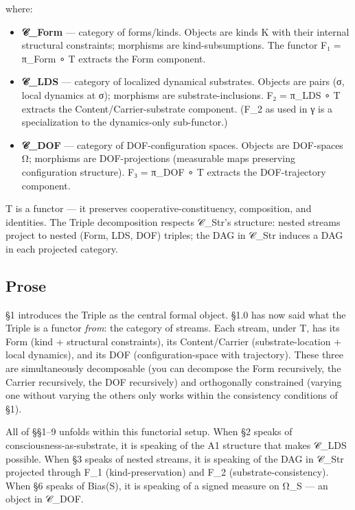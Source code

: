 \documentclass[11pt, openany]{book}
\begin{document}
where:

\begin{itemize}
\item \textbf{𝒞\_\allowbreak{}Form} --- category of forms/kinds. Objects are kinds K with their internal structural constraints; morphisms are kind-subsumptions. The functor F₁ = π\_\allowbreak{}Form ∘ T extracts the Form component.
\item \textbf{𝒞\_\allowbreak{}LDS} --- category of localized dynamical substrates. Objects are pairs (σ, local dynamics at σ); morphisms are substrate-inclusions. F₂ = π\_\allowbreak{}LDS ∘ T extracts the Content/Carrier-substrate component. (F\_\allowbreak{}2 as used in γ is a specialization to the dynamics-only sub-functor.)
\item \textbf{𝒞\_\allowbreak{}DOF} --- category of DOF-configuration spaces. Objects are DOF-spaces Ω; morphisms are DOF-projections (measurable maps preserving configuration structure). F₃ = π\_\allowbreak{}DOF ∘ T extracts the DOF-trajectory component.
\end{itemize}

T is a functor --- it preserves cooperative-constituency, composition, and identities. The Triple decomposition respects 𝒞\_\allowbreak{}Str's structure: nested streams project to nested (Form, LDS, DOF) triples; the DAG in 𝒞\_\allowbreak{}Str induces a DAG in each projected category.

\subsection{Prose}

§1 introduces the Triple as the central formal object. §1.0 has now said what the Triple is a functor \textit{from}: the category of streams. Each stream, under T, has its Form (kind + structural constraints), its Content/Carrier (substrate-location + local dynamics), and its DOF (configuration-space with trajectory). These three are simultaneously decomposable (you can decompose the Form recursively, the Carrier recursively, the DOF recursively) and orthogonally constrained (varying one without varying the others only works within the consistency conditions of §1).

All of §§1–9 unfolds within this functorial setup. When §2 speaks of consciousness-as-substrate, it is speaking of the A1 structure that makes 𝒞\_\allowbreak{}LDS possible. When §3 speaks of nested streams, it is speaking of the DAG in 𝒞\_\allowbreak{}Str projected through F\_\allowbreak{}1 (kind-preservation) and F\_\allowbreak{}2 (substrate-consistency). When §6 speaks of Bias(S), it is speaking of a signed measure on Ω\_\allowbreak{}S --- an object in 𝒞\_\allowbreak{}DOF.
\end{document}
